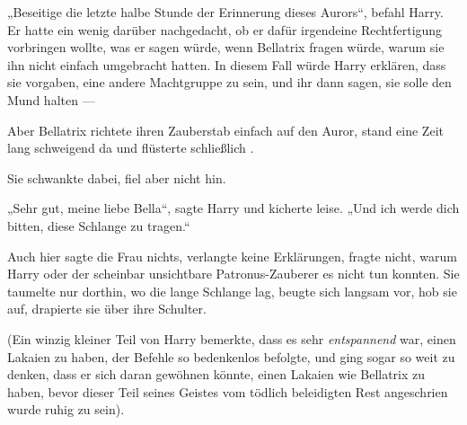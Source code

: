 „Beseitige die letzte halbe Stunde der Erinnerung dieses Aurors“, befahl Harry. Er hatte ein wenig darüber nachgedacht, ob er dafür irgendeine Rechtfertigung vorbringen wollte, was er sagen würde, wenn Bellatrix fragen würde, warum sie ihn nicht einfach umgebracht hatten. In diesem Fall würde Harry erklären, dass sie vorgaben, eine andere Machtgruppe zu sein, und ihr dann sagen, sie solle den Mund halten —

Aber Bellatrix richtete ihren Zauberstab einfach auf den Auror, stand eine Zeit lang schweigend da und flüsterte schließlich .

Sie schwankte dabei, fiel aber nicht hin.

„Sehr gut, meine liebe Bella“, sagte Harry und kicherte leise.
„Und ich werde dich bitten, diese Schlange zu tragen.“

Auch hier sagte die Frau nichts, verlangte keine Erklärungen, fragte nicht, warum Harry oder der scheinbar unsichtbare Patronus-Zauberer es nicht tun konnten. Sie taumelte nur dorthin, wo die lange Schlange lag, beugte sich langsam vor, hob sie auf, drapierte sie über ihre Schulter.

(Ein winzig kleiner Teil von Harry bemerkte, dass es sehr \emph{entspannend} war, einen Lakaien zu haben, der Befehle so bedenkenlos befolgte, und ging sogar so weit zu denken, dass er sich daran gewöhnen könnte, einen Lakaien wie Bellatrix zu haben, bevor dieser Teil seines Geistes vom tödlich beleidigten Rest angeschrien wurde ruhig zu sein).

